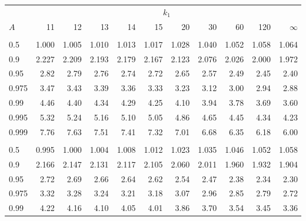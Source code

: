 \documentclass[]{article}
\begin{document}
\begin{table}[H]
\centering
\begin{tabular}{lrrrrrrrrrr}
\toprule
\multicolumn{1}{c}{ } & \multicolumn{10}{c}{$k_1$} \\
\cmidrule(l{3pt}r{3pt}){2-11}
\hspace{1.1em}$A$ & 11 & 12 & 13 & 14 & 15 & 20 & 30 & 60 & 120 & $\infty$\\
\midrule
\addlinespace[0.3em]
\multicolumn{11}{l}{\textbf{$k_2=11$}}\\
\hspace{1em}0.5 & 1.000 & 1.005 & 1.010 & 1.013 & 1.017 & 1.028 & 1.040 & 1.052 & 1.058 & 1.064\\
\hspace{1em}0.9 & 2.227 & 2.209 & 2.193 & 2.179 & 2.167 & 2.123 & 2.076 & 2.026 & 2.000 & 1.972\\
\hspace{1em}0.95 & 2.82 & 2.79 & 2.76 & 2.74 & 2.72 & 2.65 & 2.57 & 2.49 & 2.45 & 2.40\\
\hspace{1em}0.975 & 3.47 & 3.43 & 3.39 & 3.36 & 3.33 & 3.23 & 3.12 & 3.00 & 2.94 & 2.88\\
\hspace{1em}0.99 & 4.46 & 4.40 & 4.34 & 4.29 & 4.25 & 4.10 & 3.94 & 3.78 & 3.69 & 3.60\\
\hspace{1em}0.995 & 5.32 & 5.24 & 5.16 & 5.10 & 5.05 & 4.86 & 4.65 & 4.45 & 4.34 & 4.23\\
\hspace{1em}0.999 & 7.76 & 7.63 & 7.51 & 7.41 & 7.32 & 7.01 & 6.68 & 6.35 & 6.18 & 6.00\\
\addlinespace[0.3em]
\multicolumn{11}{l}{\textbf{$k_2=12$}}\\
\hspace{1em}0.5 & 0.995 & 1.000 & 1.004 & 1.008 & 1.012 & 1.023 & 1.035 & 1.046 & 1.052 & 1.058\\
\hspace{1em}0.9 & 2.166 & 2.147 & 2.131 & 2.117 & 2.105 & 2.060 & 2.011 & 1.960 & 1.932 & 1.904\\
\hspace{1em}0.95 & 2.72 & 2.69 & 2.66 & 2.64 & 2.62 & 2.54 & 2.47 & 2.38 & 2.34 & 2.30\\
\hspace{1em}0.975 & 3.32 & 3.28 & 3.24 & 3.21 & 3.18 & 3.07 & 2.96 & 2.85 & 2.79 & 2.72\\
\hspace{1em}0.99 & 4.22 & 4.16 & 4.10 & 4.05 & 4.01 & 3.86 & 3.70 & 3.54 & 3.45 & 3.36\\

\end{tabular}
\end{table}
\end{document}
